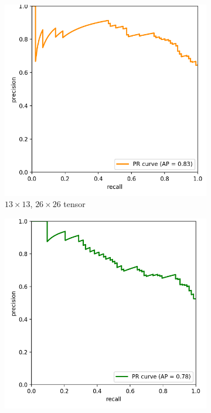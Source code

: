 \begin{figure}[h]
	\begin{center}
		\begin{subfigure}[b]{0.49\textwidth}
			\includegraphics[width=\textwidth]{thesis-template-master/images/2 tensor cellyolo PR on val dataset.png}
			\caption{$13 \times 13$, $26 \times 26$ tensor }
			\label{fig:res18}
		\end{subfigure}
		\begin{subfigure}[b]{0.49\textwidth}
		    \centering
			\includegraphics[width=\textwidth]{thesis-template-master/images/52 tensor cellyolo PR on val dataset.png}

\end{subfigure}
\end{center}
\end{figure}
